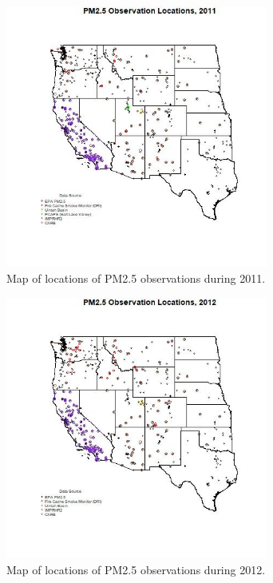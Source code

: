 \begin{figure} 
\centering 
\includegraphics[width=0.77\textwidth]{Code_Outputs/MapPM25_All_Sitesplot_year2011.jpg} 
\caption{\label{fig:MapPM25Loc2011}Map of locations of PM2.5 observations during 2011.} 
\end{figure} 
 

\begin{figure} 
\centering 
\includegraphics[width=0.77\textwidth]{Code_Outputs/MapPM25_All_Sitesplot_year2012.jpg} 
\caption{\label{fig:MapPM25Loc2012}Map of locations of PM2.5 observations during 2012.} 
\end{figure} 
 

